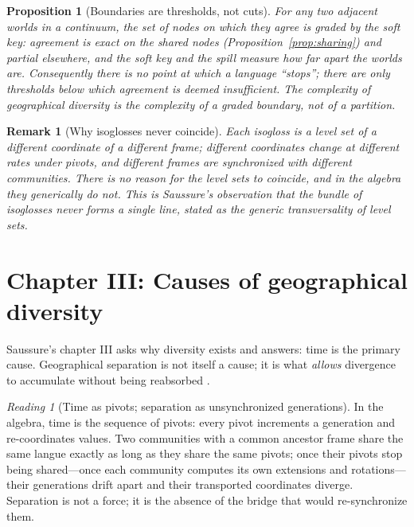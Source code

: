 \documentclass[11pt,a4paper]{article}
\newtheorem{proposition}[principle]{Proposition}
\newtheorem{remark}[principle]{Remark}
\theoremstyle{remark}
\newtheorem{reading}[principle]{Reading}
\begin{document}
\begin{proposition}[Boundaries are thresholds, not cuts]
\label{prop:threshold}
For any two adjacent worlds in a continuum, the set of nodes on which they
agree is graded by the soft key: agreement is exact on the shared nodes
(Proposition~\ref{prop:sharing}) and partial elsewhere, and the soft key and
the spill measure how far apart the worlds are. Consequently there is no
point at which a language ``stops''; there are only thresholds below which
agreement is deemed insufficient. The complexity of geographical diversity is
the complexity of a graded boundary, not of a partition.
\end{proposition}

\begin{remark}[Why isoglosses never coincide]
Each isogloss is a level set of a different coordinate of a different frame;
different coordinates change at different rates under pivots, and different
frames are synchronized with different communities. There is no reason for
the level sets to coincide, and in the algebra they generically do not. This
is Saussure's observation that the bundle of isoglosses never forms a single
line, stated as the generic transversality of level sets.
\end{remark}

\section{Chapter III: Causes of geographical diversity}
\label{sec:ch3}

Saussure's chapter III asks why diversity exists and answers: time is the
primary cause. Geographical separation is not itself a cause; it is what
\emph{allows} divergence to accumulate without being reabsorbed
\cite[Part IV, ch.~III]{harris1983}.

\begin{reading}[Time as pivots; separation as unsynchronized generations]
\label{read:causes}
In the algebra, time is the sequence of pivots: every pivot increments a
generation and re-coordinates values. Two communities with a common ancestor
frame share the same langue exactly as long as they share the same pivots;
once their pivots stop being shared---once each community computes its own
extensions and rotations---their generations drift apart and their
transported coordinates diverge. Separation is not a force; it is the absence
of the bridge that would re-synchronize them.
\end{reading}
\end{document}
